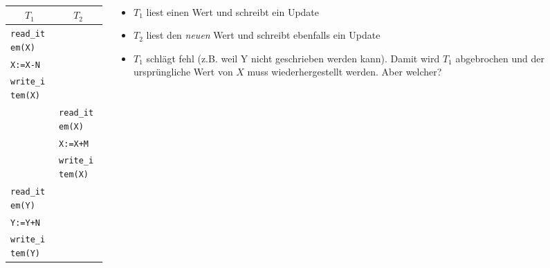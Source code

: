 \begin{frame}{\insertsection}
	\framesubtitle{\insertsubsection}
	\begin{columns}
	\begin{column}{.48\textwidth}
	\begin{tabular}{p{3.0cm}|p{3.0cm}}
			\multicolumn{1}{c|}{$T_1$} & \multicolumn{1}{c}{$T_2$}\\\hline
			\texttt{read\_item(X)} & \\
			\texttt{X:=X-N} & \\ 
			\texttt{write\_item(X)} & \\
			& \texttt{read\_item(X)} \\
			& \texttt{X:=X+M}\\
			& \texttt{write\_item(X)}\\
			\texttt{read\_item(Y)} & \\
			\texttt{Y:=Y+N}& \\
			\cellcolor{Yellow}\texttt{write\_item(Y)} & \\\hline
			\end{tabular}
		\end{column}
		\begin{column}{.48\textwidth}
		\begin{itemize}
			\item $T_1$ liest einen Wert und schreibt ein Update 
			\item $T_2$ liest den \textit{neuen} Wert und schreibt ebenfalls ein Update 
			\item $T_1$ schlägt fehl (z.B. weil Y nicht geschrieben werden kann). Damit wird $T_1$ abgebrochen und der ursprüngliche Wert von $X$ muss wiederhergestellt werden. \alert{Aber welcher?}
		\end{itemize}
		\end{column}
	\end{columns}
	\end{frame}

